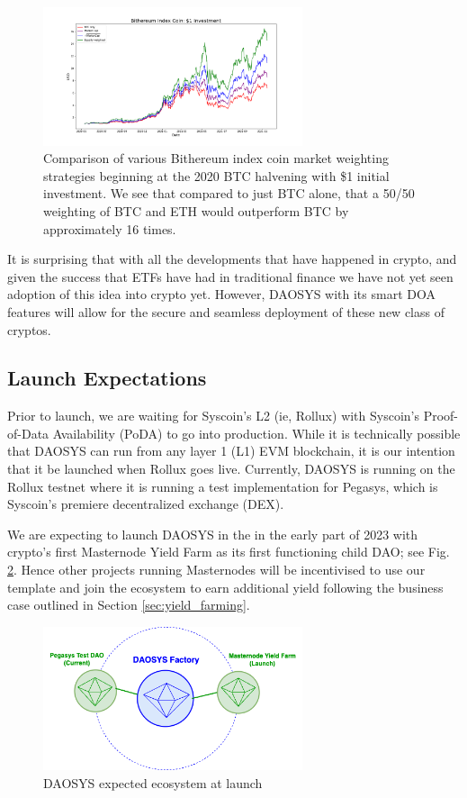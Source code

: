 \documentclass[journal,twocolumn,12pt]{ieeesyscoin}
\begin{document}
\begin{figure}[h!]
\includegraphics[width=3in]{img/index_coin.png}
\caption{Comparison of various Bithereum index coin market weighting strategies beginning at the 2020 BTC halvening with \$1 initial investment. We see that compared to just BTC alone, that a 50/50 weighting of BTC and ETH would outperform BTC by approximately 16 times.} 
\label{fig:crypto_index}
\end{figure} 

It is surprising that with all the developments that have happened in crypto, and given the success that ETFs have had in traditional finance we have not yet seen adoption of this idea into crypto yet. However, DAOSYS with its smart DOA features will allow for the secure and seamless deployment of these new class of cryptos.  

\subsection{Launch Expectations}

Prior to launch, we are waiting for Syscoin's L2 (ie, Rollux) \cite{ROL22, Sig21a, Sig21b} with Syscoin's Proof-of-Data Availability (PoDA) \cite{PODA22} to go into production. While it is technically possible that DAOSYS can run from any layer 1 (L1) EVM blockchain, it is our intention that it be launched when Rollux goes live. Currently, DAOSYS is running on the Rollux testnet where it is running a test implementation for Pegasys, which is Syscoin's premiere decentralized exchange (DEX). 

We are expecting to launch DAOSYS in the in the early part of 2023 with crypto's first Masternode Yield Farm as its first functioning child DAO; see Fig. \ref{fig:daosys_launch}. Hence other projects running Masternodes will be incentivised to use our template and join the ecosystem to earn additional yield following the business case outlined in Section \ref{sec:yield_farming}.

\begin{figure}[h!]
\includegraphics[width=3in]{img/daosys_launch.png}
\caption{DAOSYS expected ecosystem at launch} 
\label{fig:daosys_launch}
\end{figure} 
\end{document}
